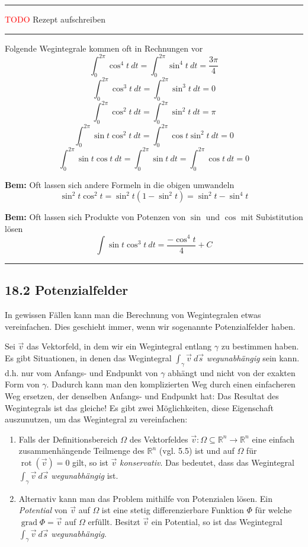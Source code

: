 \documentclass[a4paper,landscape,8pt]{extarticle}
\newcommand{\R}{\mathbb{R}}
\newcommand{\todo}{\textcolor{red}{TODO }}
\newcommand{\sep}{\vspace{5pt}\noindent\hrule\vspace{5pt}}
\newcommand{\Bem}{\textbf{Bem: }}
\DeclareMathOperator{\rot}{rot}
\DeclareMathOperator{\grad}{grad}
\begin{document}
\begin{multicols*}{4}
\sep

\begin{warmup}
\Vorgehen

\todo Rezept aufschreiben

\sep

\end{warmup}

Folgende Wegintegrale kommen oft in Rechnungen vor
\[
\int_0^{2\pi} \cos^4 t \ dt = \int_0^{2\pi} \sin^4 t \ dt = \frac{3\pi}{4}
\]
\[
\int_0^{2\pi} \cos^3 t \ dt = \int_0^{2\pi} \sin^3 t \ dt = 0
\]
\[
\int_0^{2\pi} \cos^2 t \ dt = \int_0^{2\pi} \sin^2 t \ dt = \pi
\]
\[
\int_0^{2\pi} \sin t\cos^2 t \ dt = \int_0^{2\pi} \cos t \sin^2 t \ dt = 0
\]
\[
\int_0^{2\pi} \sin t\cos t \ dt = \int_0^{2\pi} \sin t \ dt= \int_0^{2\pi} \cos
t \ dt = 0
\]

\Bem Oft lassen sich andere Formeln in die obigen umwandeln
\[
\sin^2t\cos^2 t = \sin^2t (1-\sin^2 t) = \sin^2 t - \sin^4 t
\]

\Bem Oft lassen sich Produkte von Potenzen von $\sin$ und $\cos$ mit
Subistitution lösen
\[
\int \sin t \cos^3 t \ dt
=
\frac{-\cos^4 t}{4} + C
\]

\sep

\subsection{18.2 Potenzialfelder}

In gewissen Fällen kann man die Berechnung von Wegintegralen etwas vereinfachen.
Dies geschieht immer, wenn wir sogenannte Potenzialfelder haben.

Sei $\vec{v}$ das Vektorfeld, in dem wir ein Wegintegral entlang $\gamma$ zu
bestimmen haben. Es gibt Situationen, in denen das Wegintegral $\int_\gamma
\vec{v} \ d\vec{s}$ \emph{wegunabhängig} sein kann. d.h. nur vom Anfangs- und
Endpunkt von $\gamma$ abhängt und nicht von der exakten Form von $\gamma$.
Dadurch kann man den komplizierten Weg durch einen einfacheren Weg ersetzen,
der denselben Anfangs- und Endpunkt hat: Das Resultat des Wegintegrals ist das
gleiche! Es gibt zwei Möglichkeiten, diese Eigenschaft auszunutzen, um das
Wegintegral zu vereinfachen:
\begin{enumerate}[label=\roman*)]
  \item Falls der Definitionsbereich $\Omega$ des Vektorfeldes
  $\vec{v}\colon\Omega\subseteq\R^n\to\R^n$ eine einfach zusammenhängende
  Teilmenge des $\R^n$ (vgl. 5.5) ist und auf $\Omega$ für
  $\rot(\vec{v})=0$ gilt, so ist $\vec{v}$ \emph{konservativ}. Das bedeutet,
  dass das Wegintegral $\int_\gamma \vec{v} \ d\vec{s}$ \emph{wegunabhängig}
  ist.
  \item Alternativ kann man das Problem mithilfe von Potenzialen lösen. Ein
  \emph{Potential} von $\vec{v}$ auf $\Omega$ ist eine stetig differenzierbare
  Funktion $\Phi$ für welche $\grad\Phi=\vec{v}$ auf $\Omega$ erfüllt. Besitzt
  $\vec{v}$ ein Potential, so ist das Wegintegral $\int_\gamma \vec{v} \
  d\vec{s}$ \emph{wegunabhängig}.
\end{enumerate}


\end{multicols*}
\end{document}
